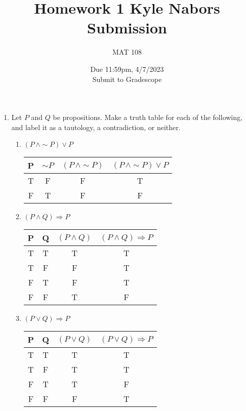 \documentclass{article}
\title{Homework 1 Kyle Nabors Submission}
\author{MAT 108}
\date{Due 11:59pm, 4/7/2023\\
\vspace{0.1cm}
Submit to Gradescope}
\begin{document}
\maketitle
\begin{enumerate}[labelindent=0pt,leftmargin=0pt]
{\large}
    \setlength{\itemsep}{13pt}
    \item Let $P$ and $Q$ be propositions. Make a truth table for each of
the following, and label it as a tautology, a contradiction, or neither.
    \begin{enumerate}
        \item $(P\,\land\sim\! P)\lor P$
        
        \begin{flushleft}
         \begin{tabular}{||c c c c||} 
        \hline
        P & $\sim\! P$ & $(P\,\land\sim\! P)$ & $(P\,\land\sim\! P)\lor P$  \\ [0.5ex] 
        \hline\hline
        T & F & F & T \\
        F & T & F & F \\
        \hline
        \end{tabular}
        \end{flushleft}
        
        \item $(P\land Q)\Rightarrow P$
        
        \begin{flushleft}
         \begin{tabular}{||c c c c||} 
        \hline
        P & Q & $(P\land Q)$ & $(P\land Q)\Rightarrow P$  \\ [0.5ex] 
        \hline\hline
        T & T & T & T \\
        T & F & F & T \\
        F & T & F & T \\
        F & F & T & F \\
        \hline
        \end{tabular}
        \end{flushleft}
        
        \item $(P\lor Q)\Rightarrow P$
                
        \begin{flushleft}
         \begin{tabular}{||c c c c||} 
        \hline
        P & Q & $(P\lor Q)$ & $(P\lor Q)\Rightarrow P$  \\ [0.5ex] 
        \hline\hline
        T & T & T & T \\
        T & F & T & T \\
        F & T & T & F \\
        F & F & F & T \\
        \hline
        \end{tabular}
        \end{flushleft}
        

\end{enumerate}
\end{enumerate}
\end{document}
